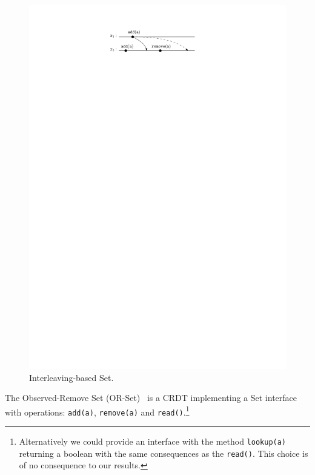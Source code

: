 \begin{figure}
  \vspace{-5.5mm}
  \centering
  \includegraphics[width=0.35 \textwidth]{./figures/OR-Set-simple}
  \vspace{-6mm}
  \caption{Interleaving-based Set.}
  \vspace{-2mm}
  \label{fig:or-set-simple}
\end{figure}
The Observed-Remove Set (OR-Set)~\cite{ShapiroPBZ11} is a CRDT
implementing a Set interface with operations: \lstinline|add(a)|,
\lstinline|remove(a)| and \lstinline|read()|.\footnote{Alternatively
  we could provide an interface with the method \lstinline|lookup(a)|
  returning a boolean with the same consequences as the
  \lstinline|read()|.
  This choice is of no consequence to our results.}
%

